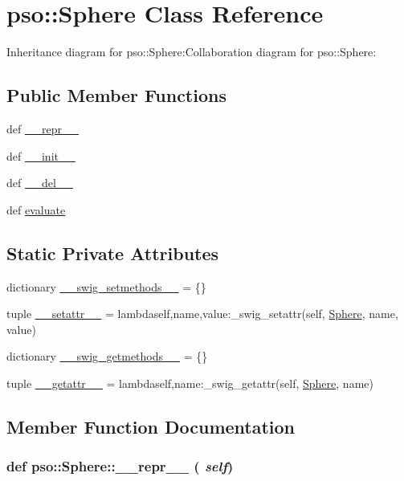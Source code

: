 \hypertarget{classpso_1_1Sphere}{
\section{pso::Sphere Class Reference}
\label{classpso_1_1Sphere}
}
Inheritance diagram for pso::Sphere:Collaboration diagram for pso::Sphere:\subsection*{Public Member Functions}
\begin{CompactItemize}
\item 
def \hyperlink{classpso_1_1Sphere_97873feed050d378f3f3a83340619732}{\_\-\_\-repr\_\-\_\-}
\item 
def \hyperlink{classpso_1_1Sphere_e4b014b1b87400b7a6a35b5f2311620a}{\_\-\_\-init\_\-\_\-}
\item 
def \hyperlink{classpso_1_1Sphere_71a5156269bbb4a9ccc41410990e5dcb}{\_\-\_\-del\_\-\_\-}
\item 
def \hyperlink{classpso_1_1Sphere_2c17788061780a2050cebccfec6a49c7}{evaluate}
\end{CompactItemize}
\subsection*{Static Private Attributes}
\begin{CompactItemize}
\item 
dictionary \hyperlink{classpso_1_1Sphere_9c2b9a1bd59f55c2010cbceda68c5916}{\_\-\_\-swig\_\-setmethods\_\-\_\-} = \{\}
\item 
tuple \hyperlink{classpso_1_1Sphere_303c4331c24184d721f1284e405b7453}{\_\-\_\-setattr\_\-\_\-} = lambdaself,name,value:\_\-swig\_\-setattr(self, \hyperlink{classpso_1_1Sphere}{Sphere}, name, value)
\item 
dictionary \hyperlink{classpso_1_1Sphere_0c0cc3d04e98d1dc9576e1bdf5fa34ed}{\_\-\_\-swig\_\-getmethods\_\-\_\-} = \{\}
\item 
tuple \hyperlink{classpso_1_1Sphere_bf0e6b7f99fe3b2202b4f73441f594c6}{\_\-\_\-getattr\_\-\_\-} = lambdaself,name:\_\-swig\_\-getattr(self, \hyperlink{classpso_1_1Sphere}{Sphere}, name)
\end{CompactItemize}


\subsection{Member Function Documentation}
\hypertarget{classpso_1_1Sphere_97873feed050d378f3f3a83340619732}{
\subsubsection{\setlength{\rightskip}{0pt plus 5cm}def pso::Sphere::\_\-\_\-repr\_\-\_\- ( {\em self})}}
\label{classpso_1_1Sphere_97873feed050d378f3f3a83340619732}




